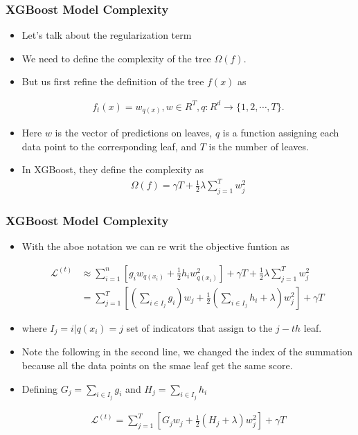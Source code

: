 \documentclass[
  shownotes,
  xcolor={svgnames},
  hyperref={colorlinks,citecolor=DarkBlue,linkcolor=DarkRed,urlcolor=DarkBlue}
  , aspectratio=169]{beamer}
\begin{document}
\begin{frame}[fragile]
\frametitle{XGBoost Model Complexity}

\begin{itemize}
\item Let's talk about the  regularization term 
\item We need to define the complexity of the tree $\Omega(f)$.
\item But us first refine the definition of the tree $f(x)$ as

 
\begin{align}
f_t(x) = w_{q(x)}, w \in R^T, q:R^d\rightarrow \{1,2,\cdots,T\} .
\end{align}


\item Here $w$ is the vector of predictions on leaves, $q$ is a function assigning each data point to the corresponding leaf, and $T$ is the number of leaves. 


\item In XGBoost, they define the complexity as
\begin{align}
\Omega(f) = \gamma T + \frac{1}{2}\lambda \sum_{j=1}^T w_j^2
\end{align}


\end{itemize}
 \end{frame}

\begin{frame}[fragile]
\frametitle{XGBoost Model Complexity}

\begin{itemize}
\item With the aboe notation we can re writ the objective funtion as 


\begin{align}
\mathcal{L}^{(t)} &\approx \sum_{i=1}^n [g_i w_{q(x_i)} + \frac{1}{2} h_i w_{q(x_i)}^2] + \gamma T + \frac{1}{2}\lambda \sum_{j=1}^T w_j^2\\
&= \sum^T_{j=1} [(\sum_{i\in I_j} g_i) w_j + \frac{1}{2} (\sum_{i\in I_j} h_i + \lambda) w_j^2 ] + \gamma T\
\end{align}

\item where $I_j={i|q(x_i)=j}$ set of indicators that assign to the $j-th$ leaf.
\item Note the following in the second line, we changed the index of the summation because all the data points on the smae leaf get the same score.
\item Defining $G_j = \sum_{i\in I_j} g_i$ and $H_j = \sum_{i\in I_j} h_i$

\begin{align}
\mathcal{L}^{(t)} = \sum^T_{j=1} [G_jw_j + \frac{1}{2} (H_j+\lambda) w_j^2] +\gamma T
\end{align}

\end{itemize}

\end{frame}
\end{document}
